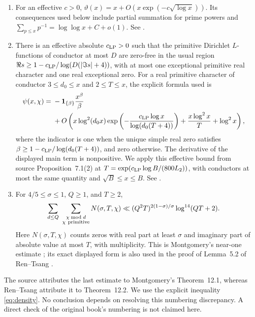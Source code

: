 \begin{enumerate}[label=(A\arabic*)]
\item\label{input:pnt} For an effective \(c>0\),
\(\vartheta(x)=x+O(x\exp(-c\sqrt{\log x}))\).
Its consequences used below include partial summation for prime powers
and \(\sum_{p\le x}p^{-1}=\log\log x+C+o(1)\).
See \cite{LandauPage}.
\item\label{input:page} There is an effective absolute \(c_{\rm LP}>0\)
such that the primitive Dirichlet \(L\)-functions of conductor at most
\(D\) are zero-free in the usual region
\(\Re s\ge1-c_{\rm LP}/\log(D(|\Im s|+4))\), with at most one
exceptional primitive real character and one real exceptional zero.
For a real primitive character of conductor \(3\le d_0\le x\)
and \(2\le T\le x\), the explicit formula used is
\begin{align*}
 \psi(x,\chi)={}&-\mathbf1_{\{\beta\}}\frac{x^\beta}{\beta}\\
 &+O\left(x\log^2(d_0x)
       \exp\left(-\frac{c_{\rm LP}\log x}{\log(d_0(T+4))}\right)
       +\frac{x\log^2x}{T}+\log^2x\right),
\end{align*}
where the indicator is one when the unique simple real zero satisfies
\(\beta\ge1-c_{\rm LP}/\log(d_0(T+4))\), and zero otherwise.
The derivative of the displayed main term is nonpositive.  We apply
this effective bound from source Proposition~7.1(2) at
\(T=\exp(c_{\rm LP}\log B/(800L_2))\), with conductors at most
the same quantity and \(\sqrt B\le x\le B\).
See \cite{LandauPage}.
\item\label{input:density} For \(4/5\le\sigma\le1\), \(Q\ge1\),
and \(T\ge2\),
\begin{equation}\label{eq:density}
 \sum_{d\le Q}\ \sum_{\substack{\chi\bmod d\\\chi\ {\rm primitive}}}
 N(\sigma,T,\chi)
 \ll (Q^2T)^{2(1-\sigma)/\sigma}\log^{14}(QT+2).
\end{equation}
Here \(N(\sigma,T,\chi)\) counts zeros with real part at least
\(\sigma\) and imaginary part of absolute value at most \(T\), with
multiplicity.  This is Montgomery's near-one estimate
\cite{Montgomery1971}; its exact displayed form is also used in the
proof of Lemma~5.2 of Ren--Tsang \cite{RenTsang2004}.
\end{enumerate}

\begin{remark}
The source attributes the last estimate to Montgomery's Theorem~12.1,
whereas Ren--Tsang attribute it to Theorem~12.2.  We use the explicit
inequality \eqref{eq:density}.  No conclusion depends on resolving this
numbering discrepancy.  A direct check of the original book's numbering
is not claimed here.
\end{remark}

